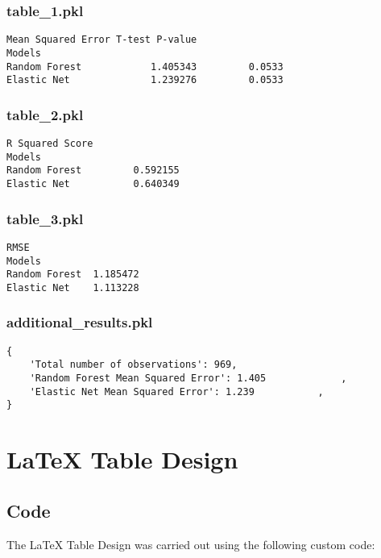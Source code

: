 \documentclass[11pt]{article}
\begin{document}
\subsubsection*{table\_1.pkl}

\begin{Verbatim}[tabsize=4]
               Mean Squared Error T-test P-value
Models
Random Forest            1.405343         0.0533
Elastic Net              1.239276         0.0533
\end{Verbatim}

\subsubsection*{table\_2.pkl}

\begin{Verbatim}[tabsize=4]
               R Squared Score
Models
Random Forest         0.592155
Elastic Net           0.640349
\end{Verbatim}

\subsubsection*{table\_3.pkl}

\begin{Verbatim}[tabsize=4]
                   RMSE
Models
Random Forest  1.185472
Elastic Net    1.113228
\end{Verbatim}

\subsubsection*{additional\_results.pkl}

\begin{Verbatim}[tabsize=4]
{
    'Total number of observations': 969,
    'Random Forest Mean Squared Error': 1.405             ,
    'Elastic Net Mean Squared Error': 1.239           ,
}
\end{Verbatim}

\section{LaTeX Table Design}
\subsection{{Code}}
The LaTeX Table Design was carried out using the following custom code:
\end{document}
